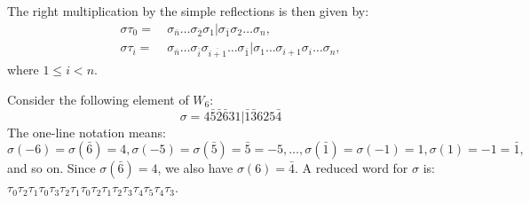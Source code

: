 \documentclass[Unicode]{cedram-alco}
\theoremstyle{definition}
\begin{document}
The right multiplication by the simple reflections is then given by:
\begin{align*}
\sigma\tau_0=&\  \sigma_{\bar n}\dots \sigma_{\bar 2}\sigma_{1}| \sigma_{\bar 1} \sigma_2\dots \sigma_n,\\
\sigma\tau_i=&\ \sigma_{\bar n}\dots\sigma_{\bar i} \sigma_{\overline{i+1}}\dots \sigma_{\bar 1}| \sigma_{1} \dots \sigma_{i+1}\sigma_i\dots \sigma_n,
\end{align*}
where  $1\leq i<n$. 

\begin{ex}\label{ex:TypeB1} Consider the following element of $W_6$:
$$
\sigma=4 \bar{5} \bar{2} \bar{6} 3 1 | \bar{1} \bar{3} 6 2 5 \bar{4}
$$
The one-line notation  means:
$$
\sigma (-6) = \sigma(\bar 6) = 4, \sigma(-5 )= \sigma(\bar 5) = \bar 5=-5, \dots,\sigma(\bar 1)= \sigma(-1) = 1, \sigma(1) = -1=\bar 1, 
$$ 
and so on. Since $ \sigma(\bar 6) = 4$, we also have $ \sigma(6) = \bar 4$.  A reduced word for $\sigma$ is: $\tau_0 \tau_2 \tau_1 \tau_0 \tau_3 \tau_2 \tau_1 \tau_0 \tau_2 \tau_1 \tau_2 \tau_3 \tau_4 \tau_5 \tau_4 \tau_3$.
\end{ex}
\end{document}
